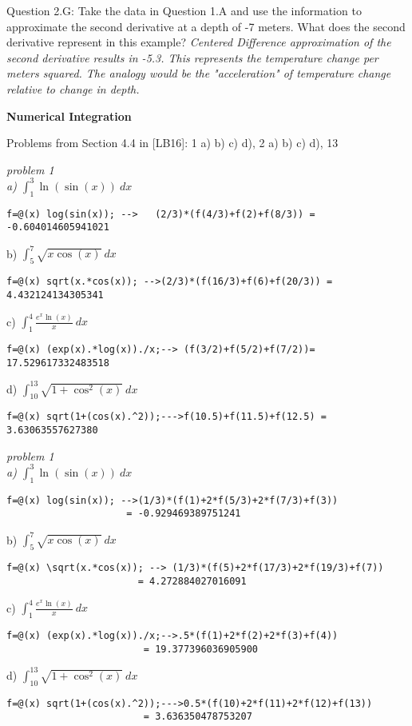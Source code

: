 \documentclass{article}
\renewcommand{\cite}[1]{[#1]}
\begin{document}
\medskip \par \noindent
%
Question 2.G: Take the data in Question 1.A and use the information to approximate the second derivative at a depth of -7 meters. What does the second derivative represent in this example? {\it \color{teal} Centered Difference approximation of the second derivative results in -5.3. This represents the temperature change per meters squared. The analogy would be the "acceleration" of temperature change relative to change in depth.}
%
\par \bigskip \par
{\bf Numerical Integration } \\  \par \medskip \noindent

\par \noindent
Problems from Section 4.4 in \cite{LB16}: 1 a) b) c) d), 2 a) b) c) d), 13 \par
{\it \color{teal} problem 1 \\
a) $\int_1^3 \ln (\sin(x))\ dx$ \begin{verbatim}
f=@(x) log(sin(x)); -->   (2/3)*(f(4/3)+f(2)+f(8/3)) =  -0.604014605941021
\end{verbatim}
b) $\int_5^7 \sqrt{x\cos(x)} \ dx$ \begin{verbatim}
f=@(x) sqrt(x.*cos(x)); -->(2/3)*(f(16/3)+f(6)+f(20/3)) = 4.432124134305341 \end{verbatim}
c) $\int_1^4 \frac {e^x \ln(x)}x \ dx$\begin{verbatim}
f=@(x) (exp(x).*log(x))./x;--> (f(3/2)+f(5/2)+f(7/2))= 17.529617332483518   
\end{verbatim}
d) $\int_{10}^{13} \sqrt{1+\cos ^2(x)} \ dx$ \begin{verbatim}
f=@(x) sqrt(1+(cos(x).^2));--->f(10.5)+f(11.5)+f(12.5) = 3.63063557627380
\end{verbatim}
}\par
{\it \color{teal} problem 1 \\
a) $\int_1^3 \ln (\sin(x))\ dx$ \begin{verbatim}
f=@(x) log(sin(x)); -->(1/3)*(f(1)+2*f(5/3)+2*f(7/3)+f(3)) 
                     = -0.929469389751241
\end{verbatim}
b) $\int_5^7 \sqrt{x\cos(x)} \ dx$ \begin{verbatim}
f=@(x) \sqrt(x.*cos(x)); --> (1/3)*(f(5)+2*f(17/3)+2*f(19/3)+f(7)) 
                       = 4.272884027016091 \end{verbatim}
c) $\int_1^4 \frac {e^x \ln(x)}x \ dx$\begin{verbatim}
f=@(x) (exp(x).*log(x))./x;-->.5*(f(1)+2*f(2)+2*f(3)+f(4)) 
                        = 19.377396036905900   
\end{verbatim}
d) $\int_{10}^{13} \sqrt{1+\cos ^2(x)} \ dx$ \begin{verbatim}
f=@(x) sqrt(1+(cos(x).^2));--->0.5*(f(10)+2*f(11)+2*f(12)+f(13))
                        = 3.636350478753207
\end{verbatim}}
\end{document}

